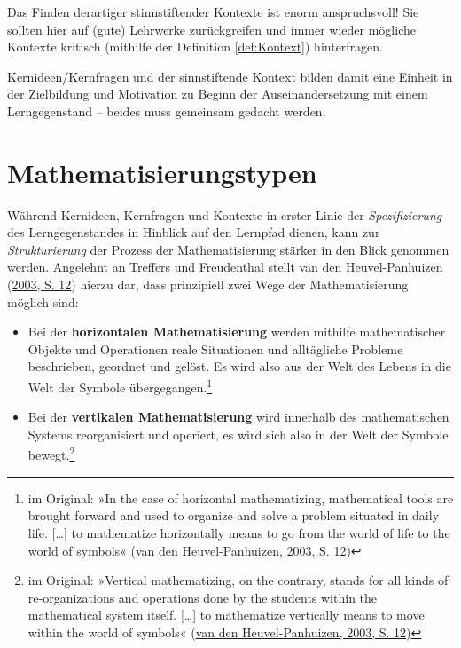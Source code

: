 \documentclass[
]{scrbook}
\theoremstyle{definition}
\theoremstyle{definition}
\theoremstyle{definition}
\theoremstyle{definition}
\theoremstyle{remark}
\begin{document}
Das Finden derartiger stinnstiftender Kontexte ist enorm anspruchsvoll! Sie sollten hier auf (gute) Lehrwerke zurückgreifen und immer wieder mögliche Kontexte kritisch (mithilfe der Definition \ref{def:Kontext}) hinterfragen.

Kernideen/Kernfragen und der sinnstiftende Kontext bilden damit eine Einheit in der Zielbildung und Motivation zu Beginn der Auseinandersetzung mit einem Lerngegenstand -- beides muss gemeinsam gedacht werden.

\hypertarget{mathematisierungstypen}{%
\section{Mathematisierungstypen}\label{mathematisierungstypen}}

Während Kernideen, Kernfragen und Kontexte in erster Linie der \emph{Spezifizierung} des Lerngegenstandes in Hinblick auf den Lernpfad dienen, kann zur \emph{Strukturierung} der Prozess der Mathematisierung stärker in den Blick genommen werden. Angelehnt an Treffers und Freudenthal stellt van den Heuvel-Panhuizen (\protect\hyperlink{ref-vandenHeuvel-Panhuizen2003}{2003, S. 12}) hierzu dar, dass prinzipiell zwei Wege der Mathematisierung möglich sind:

\begin{itemize}
\item
  Bei der \textbf{horizontalen Mathematisierung} werden mithilfe mathematischer Objekte und Operationen reale Situationen und alltägliche Probleme beschrieben, geordnet und gelöst. Es wird also aus der Welt des Lebens in die Welt der Symbole übergegangen.\footnote{im Original: »In the case of horizontal mathematizing, mathematical tools are brought forward and used to organize and solve a problem situated in daily life. {[}\ldots{]} to mathematize horizontally means to go from the world of life to the world of symbols« (\protect\hyperlink{ref-vandenHeuvel-Panhuizen2003}{van den Heuvel-Panhuizen, 2003, S. 12})}
\item
  Bei der \textbf{vertikalen Mathematisierung} wird innerhalb des mathematischen Systems reorganisiert und operiert, es wird sich also in der Welt der Symbole bewegt.\footnote{im Original: »Vertical mathematizing, on the contrary, stands for all kinds of re-organizations and operations done by the students within the mathematical system itself. {[}\ldots{]} to mathematize vertically means to move within the world of symbols« (\protect\hyperlink{ref-vandenHeuvel-Panhuizen2003}{van den Heuvel-Panhuizen, 2003, S. 12})}
\end{itemize}
\end{document}
